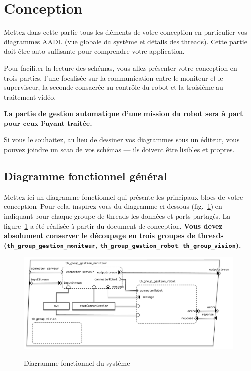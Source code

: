 \documentclass[11pt, a4paper]{paper}
\begin{document}
\newpage


\section{Conception}

{\color{red} Mettez dans cette partie tous les éléments de votre conception en particulier vos diagrammes AADL (vue globale du système et détails des threads). Cette partie doit être auto-suffisante pour comprendre votre application.

Pour faciliter la lecture des schémas, vous allez présenter votre conception en trois parties, l'une focalisée sur la communication entre le moniteur et le superviseur, la seconde consacrée au contrôle du robot et la troisième au traitement vidéo.

{\bf La partie de gestion automatique d'une mission du robot sera à part pour ceux l'ayant traitée.}

Si vous le souhaitez, au lieu de dessiner vos diagrammes sous un éditeur, vous pouvez joindre un scan de vos schémas — ils doivent être lisibles et propres.}

\subsection{Diagramme fonctionnel général}

{\color{red} Mettez ici un diagramme fonctionnel qui présente les principaux blocs de votre conception. Pour cela, inspirez vous du diagramme ci-dessous (fig.~\ref{fig:diag_fonc_gen}) en indiquant pour chaque groupe de threads les données et ports partagés. La figure~\ref{fig:diag_fonc_gen} a été réalisée à partir du document de conception. {\bf Vous devez absolument conserver le découpage en trois groupes de threads ({\tt th\_group\_gestion\_moniteur}, {\tt th\_group\_gestion\_robot}, {\tt th\_group\_vision}).}}

\begin{figure}[htbp]
\label{fig:diag_fonc_gen}
\begin{center}
{\includegraphics[scale=.5]{./figures-pdf/diag_fonc_gen}}
{\caption{Diagramme fonctionnel du système}}
\end{center}
\end{figure}
\FloatBarrier
\end{document}
